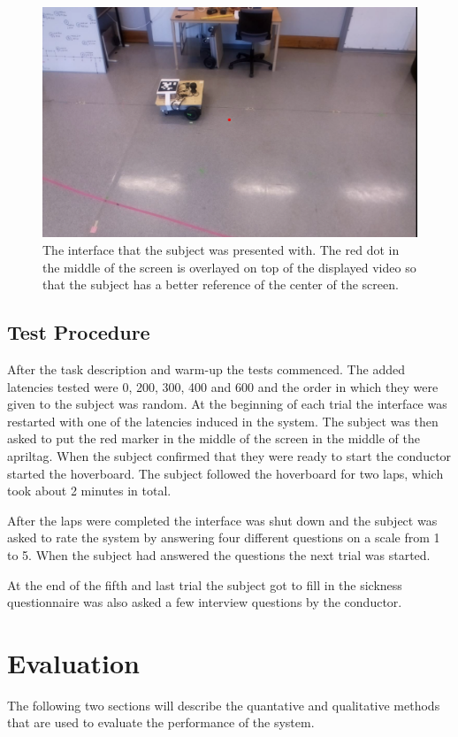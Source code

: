\documentclass[nofilelist]{cslthse-msc}
\begin{document}
\begin{figure}[!hbt]
   \centering
   \includegraphics[scale=0.3]{images/interface.png} 
   \caption{The interface that the subject was presented with. The red dot in the middle of the screen is overlayed on top of the displayed video so that the subject has a better reference of the center of the screen.}
   \label{fig:interface}
\end{figure}

\subsection{Test Procedure}
After the task description and warm-up the tests commenced. The added latencies tested were 0, 200, 300, 400 and 600 and the order in which they were given to the subject was random. 
At the beginning of each trial the interface was restarted with one of the latencies induced in the system. The subject was then asked to put the red marker in the middle of the screen in the middle of the apriltag. When the subject confirmed that they were ready to start the conductor started the hoverboard. The subject followed the hoverboard for two laps, which took about 2 minutes in total.

After the laps were completed the interface was shut down and the subject was asked to rate the system by answering four different questions on a scale from 1 to 5. When the subject had answered the questions the next trial was started.

At the end of the fifth and last trial the subject got to fill in the sickness questionnaire was also asked a few interview questions by the conductor.

\section{Evaluation}
The following two sections will describe the quantative and qualitative methods that are used to evaluate the performance of the system.
\end{document}
